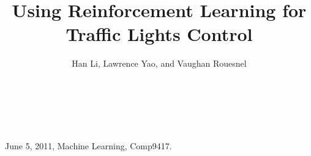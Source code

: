 \documentclass{sig-alternate}
\begin{document}
%
 {June 5, 2011, Machine Learning, Comp9417.}  

\title{Using Reinforcement Learning for  Traffic Lights Control}

\author{\alignauthor Han Li, Lawrence Yao, and Vaughan Rouesnel \\
\\
\\
\\
} 

\maketitle















\balancecolumns
\end{document}
